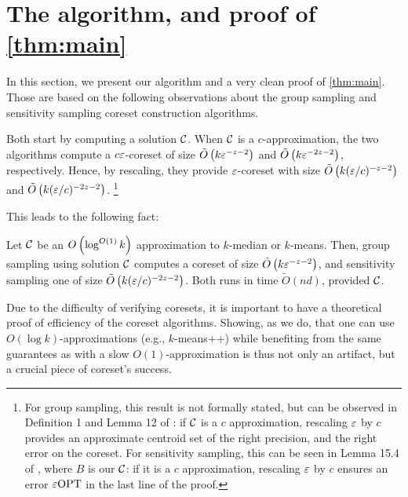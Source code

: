 \section{The algorithm, and proof of \cref{thm:main}}

In this section, we present our algorithm and a very clean proof of \cref{thm:main}. Those are based on the following observations about the group
sampling \cite{stoc21} and sensitivity sampling \cite{FeldmanL11} coreset construction algorithms.

Both start by computing a solution $\mathcal C$. When $\mathcal C$ is a $c$-approximation, the two algorithms compute a $c \varepsilon$-coreset of size $\tilde O\left(
k \varepsilon^{-z-2}\right)$ and $\tilde O\left( k \varepsilon^{-2z -2}\right)$, respectively. Hence, by rescaling, they provide $\varepsilon$-coreset with size $\tilde O\left(
k (\varepsilon/c)^{-z-2}\right)$ and $\tilde O\left( k (\varepsilon/c)^{-2z-2}\right)$. \footnote{For group sampling, this result is not formally stated, but can be observed in Definition 1 and Lemma 12 of \cite{stoc21}: if $\mathcal C$ is a $c$ approximation, rescaling $\varepsilon$ by $c$ provides an approximate centroid set of the right precision, and the right error on the coreset. For sensitivity sampling, this can be seen in Lemma 15.4 of \cite{FLArxiv}, where $B$ is our $\mathcal C$: if it is a $c$ approximation, rescaling $\varepsilon$ by $c$ ensures an error $\varepsilon \text{OPT}$ in the last line of the proof.} 

This leads to the following fact:
\begin{fact}\label{fact:logApprox}
Let $\mathcal C$ be an $O\left( \log^{O(1)} k\right)$ approximation to $k$-median or $k$-means.
Then, group sampling using solution $\mathcal C$ computes a coreset of size $\tilde O\left(
k \varepsilon^{-z-2}\right)$, and sensitivity sampling one of size $\tilde O\left( k (\varepsilon/c)^{-2z-2}\right)$. 
Both runs in time $\tilde O(nd)$, provided $\mathcal C$.
\end{fact}

Due to the difficulty of verifying coresets, it is important to have a theoretical proof of efficiency of the coreset algorithms.  Showing, as we do, that one can use $O(\log k)$-approximations (e.g., $k$-means++) while benefiting from the same
guarantees as with a slow $O(1)$-approximation is thus not only an artifact, but a crucial piece of coreset's success. 

